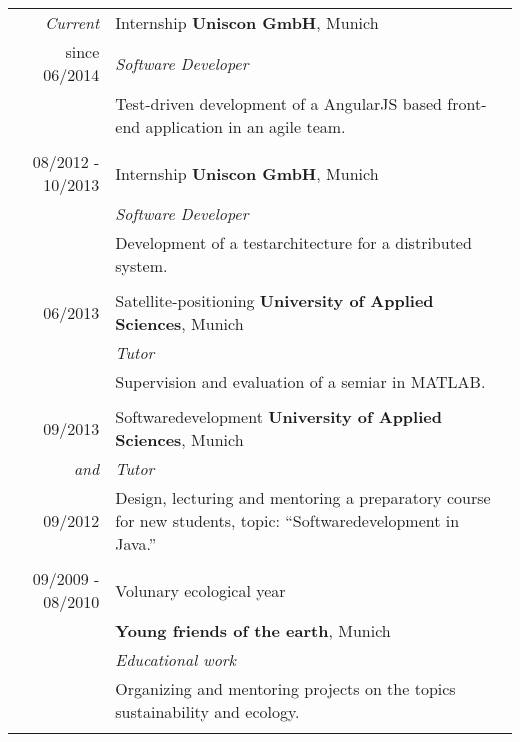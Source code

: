 \documentclass[a4paper,10pt]{article} %
\begin{document}
\begin{tabular}{r|p{11cm}}
 
\emph{Current}             &Internship \textbf{Uniscon GmbH}, Munich\\
  since \textsc{06/2014}           & \emph{Software Developer} \\
                                   & \small{Test-driven development of a AngularJS based front-end application in an agile team.} \\
\multicolumn{2}{c}{} \\

 \textsc{08/2012 - 10/2013}                & Internship \textbf{Uniscon GmbH}, Munich\\
           		    & \emph{Software Developer}\\
 & \small{Development of a testarchitecture for a distributed system.} \\
\multicolumn{2}{c}{} \\
 
 
\textsc{06/2013}           & Satellite-positioning \textbf{University of Applied Sciences}, Munich \\
                           & \emph{Tutor}\\
                           & \small{Supervision and evaluation of a semiar in MATLAB.}\\
\multicolumn{2}{c}{} \\
 
\textsc{09/2013}           & Softwaredevelopment \textbf{University of Applied Sciences}, Munich \\
\emph{and}                 & \emph{Tutor}\\
\textsc{09/2012}           & \small{Design, lecturing and mentoring a preparatory course for new students, topic: ``Softwaredevelopment in Java.''}\\
\multicolumn{2}{c}{} \\
 
 
 
\textsc{09/2009 - 08/2010} & Volunary ecological year\\
                           & \textbf{Young friends of the earth}, Munich\\
                           & \emph{Educational work}\\
                           & \small{Organizing and mentoring projects on the topics sustainability and ecology.}\\
\multicolumn{2}{c}{} \\
 
\end{tabular}
 
\end{document}
